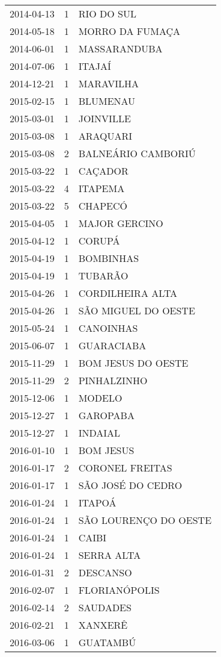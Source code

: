 \documentclass[
	12pt,				%
	openright,			%
	oneside,			%
	a4paper,			%
	english,			%
	french,				%
	spanish,			%
	brazil				%
	dvipsnames, table]{abntex2}
\begin{document}
\begin{longtable}[htbp]{ccl}
2014-04-13 & 1 & RIO DO SUL \\
2014-05-18 & 1 & MORRO DA FUMAÇA \\
2014-06-01 & 1 & MASSARANDUBA \\
2014-07-06 & 1 & ITAJAÍ \\
2014-12-21 & 1 & MARAVILHA \\
2015-02-15 & 1 & BLUMENAU \\
2015-03-01 & 1 & JOINVILLE \\
2015-03-08 & 1 & ARAQUARI \\
2015-03-08 & 2 & BALNEÁRIO CAMBORIÚ \\
2015-03-22 & 1 & CAÇADOR \\
2015-03-22 & 4 & ITAPEMA \\
2015-03-22 & 5 & CHAPECÓ \\
2015-04-05 & 1 & MAJOR GERCINO \\
2015-04-12 & 1 & CORUPÁ \\
2015-04-19 & 1 & BOMBINHAS \\
2015-04-19 & 1 & TUBARÃO \\
2015-04-26 & 1 & CORDILHEIRA ALTA \\
2015-04-26 & 1 & SÃO MIGUEL DO OESTE \\
2015-05-24 & 1 & CANOINHAS \\
2015-06-07 & 1 & GUARACIABA \\
2015-11-29 & 1 & BOM JESUS DO OESTE \\
2015-11-29 & 2 & PINHALZINHO \\
2015-12-06 & 1 & MODELO \\
2015-12-27 & 1 & GAROPABA \\
2015-12-27 & 1 & INDAIAL \\
2016-01-10 & 1 & BOM JESUS \\
2016-01-17 & 2 & CORONEL FREITAS \\
2016-01-17 & 1 & SÃO JOSÉ DO CEDRO \\
2016-01-24 & 1 & ITAPOÁ \\
2016-01-24 & 1 & SÃO LOURENÇO DO OESTE \\
2016-01-24 & 1 & CAIBI \\
2016-01-24 & 1 & SERRA ALTA \\
2016-01-31 & 2 & DESCANSO \\
2016-02-07 & 1 & FLORIANÓPOLIS \\
2016-02-14 & 2 & SAUDADES \\
2016-02-21 & 1 & XANXERÊ \\
2016-03-06 & 1 & GUATAMBÚ \\

\end{longtable}
\end{document}

